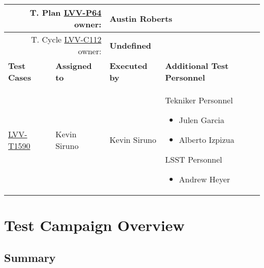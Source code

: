 \documentclass[SE,lsstdraft,STR,toc]{lsstdoc}
\providecommand{\tightlist}{
  \setlength{\itemsep}{0pt}\setlength{\parskip}{0pt}}
\begin{document}
{\small
\begin{longtable}{p{3cm}p{3cm}p{3cm}p{6cm}}
\hline
\multicolumn{2}{r}{T. Plan \href{https://jira.lsstcorp.org/secure/Tests.jspa\#/testPlan/LVV-P64}{LVV-P64} owner:} &
\multicolumn{2}{l}{\textbf{ Austin Roberts } }\\\hline
\multicolumn{2}{r}{T. Cycle \href{https://jira.lsstcorp.org/secure/Tests.jspa\#/testCycle/LVV-C112}{LVV-C112} owner:} &
\multicolumn{2}{l}{\textbf{
Undefined }
} \\\hline
\textbf{Test Cases} & \textbf{Assigned to} & \textbf{Executed by} & \textbf{Additional Test Personnel} \\ \hline
\href{https://jira.lsstcorp.org/secure/Tests.jspa#/testCase/LVV-T1590}{LVV-T1590}
& {\small Kevin Siruno } & {\small Kevin Siruno } &
\begin{minipage}[]{6cm}
\smallskip
{\small Tekniker Personnel

\begin{itemize}
\tightlist
\item
  Julen Garcia
\item
  Alberto Izpizua
\end{itemize}

LSST Personnel

\begin{itemize}
\tightlist
\item
  Andrew Heyer
\end{itemize} }
\medskip
\end{minipage}
\\ \hline
\end{longtable}
}

\newpage

\section{Test Campaign Overview}
\label{sect:overview}

\subsection{Summary}
\label{sect:summarytable}
\end{document}
